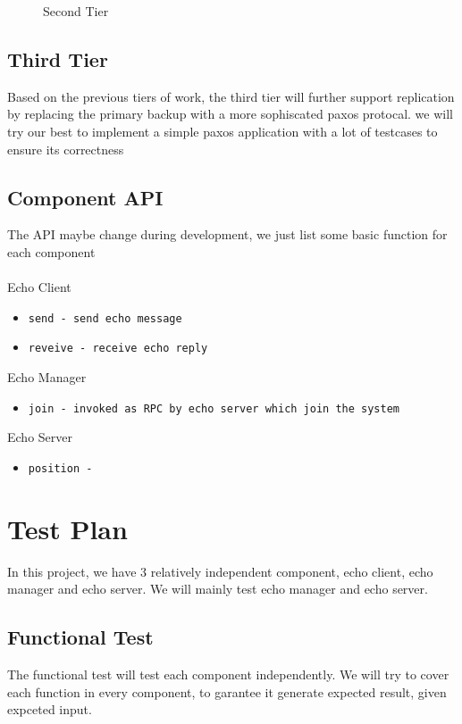 \documentclass[12pt]{article}
\begin{document}
\begin{figure}[H]
\caption{Second Tier}
\label{fig:speciation}
\end{figure}

\subsection{Third Tier}
Based on the previous tiers of work, the third tier will further support 
replication by replacing the primary backup with a more sophiscated paxos protocal. 
we will try our best to implement a simple paxos application with a lot of testcases 
to ensure its correctness 

\subsection{Component API}
The API maybe change during development, we just list some basic function for each 
component \\ \\ 
Echo Client
\begin{itemize}
  \item \texttt{send - send echo message}  
  \item \texttt{reveive - receive echo reply}  
\end{itemize}
Echo Manager
\begin{itemize}
  \item \texttt{join - invoked as RPC by echo server which join the system}
\end{itemize}
Echo Server
\begin{itemize}
  \item \texttt{position - }
\end{itemize}

\section{Test Plan}
In this project, we have 3 relatively independent component, echo client, 
echo manager and echo server. We will mainly test echo manager and echo
server.

\subsection{Functional Test}
The functional test will test each component independently. We will try to   
cover each function in every component, to garantee it generate expected  
result, given expceted input.
\end{document}
